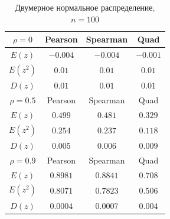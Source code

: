 \documentclass[a4]{article}
\begin{document}
\begin{table}[H]
	\caption{Двумерное нормальное распределение, $n=100$}
	\label{tab:my_label3}
	\begin{center}
		\vspace{5mm}
		\begin{tabular}{|c|c|c|c|}
			\hline
			$ \rho=0 $ & Pearson & Spearman & Quad\\
			\hline
			$ E(z) $ & $ -0.004 $ & $ -0.004 $ & $ -0.001 $\\
			\hline
			$ E(z^{2}) $ & $ 0.01 $ & $ 0.01 $ & $ 0.01 $\\
			\hline
			$ D(z) $  & $ 0.01 $ & $ 0.01 $ & $ 0.01 $\\
			\hline
			$ \rho=0.5 $ & Pearson & Spearman & Quad\\
			\hline
			$ E(z) $ & $ 0.499 $ & $ 0.481 $ & $ 0.329 $\\
			\hline
			$ E(z^{2}) $ & $ 0.254 $ & $ 0.237 $ & $ 0.118 $\\
			\hline
			$ D(z) $  & $ 0.005 $ & $ 0.006 $ & $ 0.009 $ \\
			\hline
			$ \rho=0.9 $ & Pearson & Spearman & Quad\\
			\hline       
			$ E(z) $ & $ 0.8981 $ & $ 0.8841 $ & $ 0.708 $\\
			\hline
			$ E(z^{2}) $ & $ 0.8071 $ & $ 0.7823 $ & $ 0.506 $\\
			\hline
			$ D(z) $  & $ 0.0004 $ & $ 0.0007 $ & $ 0.004 $ \\
			\hline
		\end{tabular}
	\end{center}
\end{table}
\end{document}
